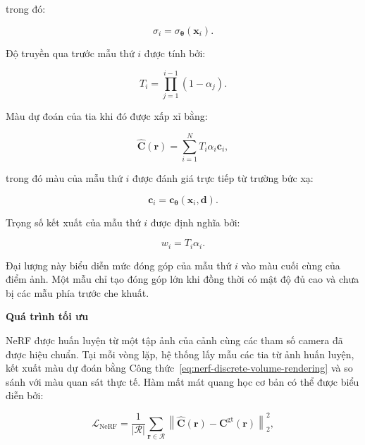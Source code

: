 trong đó:

\begin{equation}
    \sigma_i
    =
    \sigma_{\boldsymbol{\theta}}
    \left(
        \mathbf{x}_i
    \right).
\end{equation}

Độ truyền qua trước mẫu thứ $i$ được tính bởi:

\begin{equation}
    T_i
    =
    \prod_{j=1}^{i-1}
    \left(
        1-\alpha_j
    \right).
    \label{eq:nerf-discrete-transmittance}
\end{equation}

Màu dự đoán của tia khi đó được xấp xỉ bằng:

\begin{equation}
    \widehat{\mathbf{C}}
    \left(
        \mathbf{r}
    \right)
    =
    \sum_{i=1}^{N}
    T_i
    \alpha_i
    \mathbf{c}_i,
    \label{eq:nerf-discrete-volume-rendering}
\end{equation}

trong đó màu của mẫu thứ $i$ được đánh giá trực tiếp từ trường bức xạ:

\begin{equation}
    \mathbf{c}_i
    =
    \mathbf{c}_{\boldsymbol{\theta}}
    \left(
        \mathbf{x}_i,
        \mathbf{d}
    \right).
\end{equation}

Trọng số kết xuất của mẫu thứ $i$ được định nghĩa bởi:

\begin{equation}
    w_i
    =
    T_i\alpha_i.
    \label{eq:nerf-rendering-weight}
\end{equation}

Đại lượng này biểu diễn mức đóng góp của mẫu thứ $i$ vào màu cuối cùng của điểm ảnh. Một mẫu chỉ tạo đóng góp lớn khi đồng thời có mật độ đủ cao và chưa bị các mẫu phía trước che khuất.

\noindent\textbf{Quá trình tối ưu}

NeRF được huấn luyện từ một tập ảnh của cảnh cùng các tham số camera đã được hiệu chuẩn. Tại mỗi vòng lặp, hệ thống lấy mẫu các tia từ ảnh huấn luyện, kết xuất màu dự đoán bằng Công thức~\ref{eq:nerf-discrete-volume-rendering} và so sánh với màu quan sát thực tế. Hàm mất mát quang học cơ bản có thể được biểu diễn bởi:

\begin{equation}
    \mathcal{L}_{\mathrm{NeRF}}
    =
    \frac{1}{|\mathcal{R}|}
    \sum_{\mathbf{r}\in\mathcal{R}}
    \left\|
        \widehat{\mathbf{C}}
        \left(
            \mathbf{r}
        \right)
        -
        \mathbf{C}^{\mathrm{gt}}
        \left(
            \mathbf{r}
        \right)
    \right\|_2^2,
    \label{eq:nerf-photometric-loss}
\end{equation}

